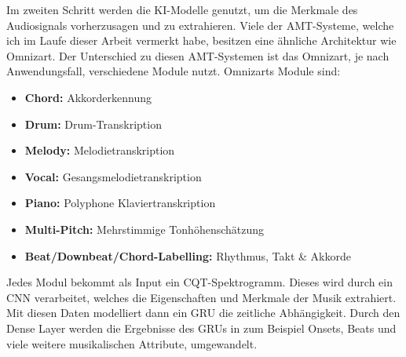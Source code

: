 Im zweiten Schritt werden die KI-Modelle genutzt, um die Merkmale des Audiosignals vorherzusagen und zu extrahieren.
Viele der AMT-Systeme, welche ich im Laufe dieser Arbeit vermerkt habe, besitzen eine ähnliche Architektur wie Omnizart.
\cite{hawthorne2017onsets}
Der Unterschied zu diesen AMT-Systemen ist das Omnizart, je nach Anwendungsfall, verschiedene Module nutzt.
Omnizarts Module sind:
\begin{itemize}
    \item \textbf{Chord:} Akkorderkennung
    \item \textbf{Drum:} Drum-Transkription
    \item \textbf{Melody:} Melodietranskription
    \item \textbf{Vocal:} Gesangsmelodietranskription
    \item \textbf{Piano:} Polyphone Klaviertranskription
    \item \textbf{Multi-Pitch:} Mehrstimmige Tonhöhenschätzung
    \item \textbf{Beat/Downbeat/Chord-Labelling:} Rhythmus, Takt \& Akkorde
\end{itemize}
Jedes Modul bekommt als Input ein CQT-Spektrogramm.
Dieses wird durch ein CNN verarbeitet, welches die Eigenschaften und Merkmale der Musik extrahiert.
Mit diesen Daten modelliert dann ein GRU die zeitliche Abhängigkeit.
Durch den Dense Layer werden die Ergebnisse des GRUs in zum Beispiel Onsets,
Beats und viele weitere musikalischen Attribute, umgewandelt.


